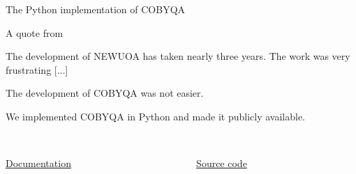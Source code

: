 \documentclass[
]{presentation}
\begin{document}
\begin{frame}{The Python implementation of COBYQA}
    \begin{block}{A quote from \textcite{Powell_2006}}
        \begin{quoting}
            \small%
            The development of NEWUOA has taken nearly \alert{three years}.
            The work was very \alert{frustrating} [...]
        \end{quoting}
        The development of COBYQA was not easier.
    \end{block}

    \smallskip

    We implemented COBYQA in \alert{Python} and made it publicly available.

    \smallskip

    \begin{columns}
        \begin{column}{0.5\textwidth}
            \begin{center}
                \\[1ex]
                \href{https://www.cobyqa.com/}{Documentation}
            \end{center}
        \end{column}
        \begin{column}{0.5\textwidth}
            \begin{center}
                \\[1ex]
                \href{https://github.com/cobyqa/cobyqa/}{Source code}
            \end{center}
        \end{column}
    \end{columns}
\end{frame}
\end{document}
